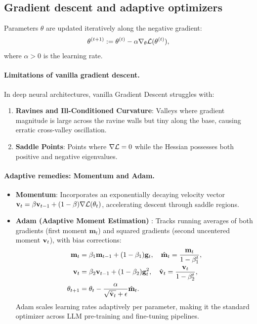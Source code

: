 \documentclass[../../main.tex]{subfiles}
\begin{document}
\subsection{Gradient descent and adaptive optimizers}
Parameters $\theta$ are updated iteratively along the negative gradient:
\begin{equation}
\theta^{(t+1)} := \theta^{(t)} - \alpha \nabla_\theta \mathcal{L}(\theta^{(t)}),
\end{equation}
where $\alpha > 0$ is the learning rate.

\paragraph{Limitations of vanilla gradient descent.}
In deep neural architectures, vanilla Gradient Descent struggles with:
\begin{enumerate}
    \item \textbf{Ravines and Ill-Conditioned Curvature}: Valleys where gradient magnitude is large across the ravine walls but tiny along the base, causing erratic cross-valley oscillation.
    \item \textbf{Saddle Points}: Points where $\nabla \mathcal{L} = 0$ while the Hessian possesses both positive and negative eigenvalues.
\end{enumerate}

\paragraph{Adaptive remedies: Momentum and Adam.}
\begin{itemize}
    \item \textbf{Momentum}: Incorporates an exponentially decaying velocity vector $\mathbf{v}_t = \beta \mathbf{v}_{t-1} + (1 - \beta) \nabla \mathcal{L}(\theta_t)$, accelerating descent through saddle regions.
    \item \textbf{Adam (Adaptive Moment Estimation)} \cite{kingma2014adam}: Tracks running averages of both gradients (first moment $\mathbf{m}_t$) and squared gradients (second uncentered moment $\mathbf{v}_t$), with bias corrections:
    \begin{align}
    \mathbf{m}_t &= \beta_1 \mathbf{m}_{t-1} + (1 - \beta_1) \mathbf{g}_t, \quad \hat{\mathbf{m}}_t = \frac{\mathbf{m}_t}{1 - \beta_1^t}, \\
    \mathbf{v}_t &= \beta_2 \mathbf{v}_{t-1} + (1 - \beta_2) \mathbf{g}_t^2, \quad \hat{\mathbf{v}}_t = \frac{\mathbf{v}_t}{1 - \beta_2^t}, \\
    \theta_{t+1} &= \theta_t - \frac{\alpha}{\sqrt{\hat{\mathbf{v}}_t} + \epsilon} \hat{\mathbf{m}}_t.
    \end{align}
    Adam scales learning rates adaptively per parameter, making it the standard optimizer across LLM pre-training and fine-tuning pipelines.
\end{itemize}
\end{document}
